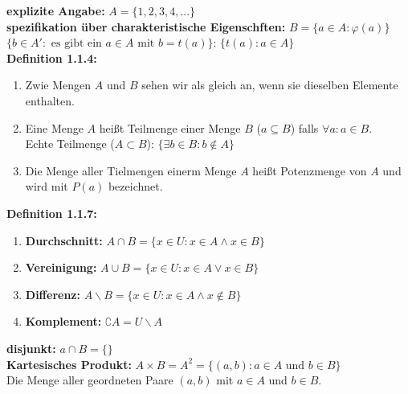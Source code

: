 \textbf{explizite Angabe:} $A=\{1,2,3,4,...\}$\\

\textbf{spezifikation über charakteristische Eigenschften:} $B = \{a\in A:\varphi (a)\}$\\

$\{b\in A': \text{ es gibt ein } a \in A \text{ mit } b = t(a)\}$: $\{t(a): a \in A\}$\\

\textbf{Definition 1.1.4:}
\begin{enumerate}
    \item Zwie Mengen $A$ und $B$ sehen wir als gleich an, wenn sie dieselben Elemente enthalten.
    \item Eine Menge $A$ heißt Teilmenge einer Menge $B$ ($a \subseteq B$) falls $\forall a: a \in B$.\\
    Echte Teilmenge ($A \subset B$): $\{\exists b\in B: b \notin A\}$
    \item Die Menge aller Tielmengen einerm Menge $A$ heißt Potenzmenge von $A$ und wird mit $P(a)$ bezeichnet.
\end{enumerate}

\textbf{Definition 1.1.7:}
\begin{enumerate}
    \item \textbf{Durchschnitt:} $A \cap B = \{x \in U : x\in A \land x \in B\}$
    \item \textbf{Vereinigung:} $A \cup B = \{x \in U : x\in A \lor x \in B\}$
    \item \textbf{Differenz:} $A \backslash B = \{x \in U : x\in A \land x \notin B\}$
    \item \textbf{Komplement:} $\complement A = U\backslash A$
\end{enumerate}
\textbf{disjunkt:} $a \cap B  = \{\}$\\

\textbf{Kartesisches Produkt:} $A \times B = A^2 = \{(a,b):a\in A \text{ und } b \in B \}$\\
Die Menge aller geordneten Paare $(a,b)$ mit $a \in A$ und  $b \in B$.\\


